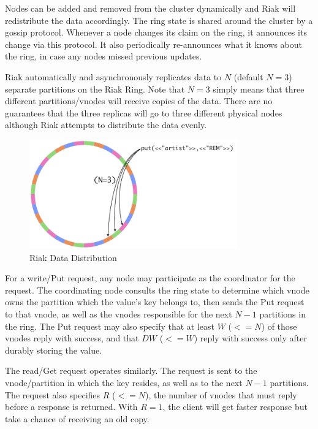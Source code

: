 \documentclass[12pt]{book}
\begin{document}
Nodes can be added and removed from the cluster dynamically and Riak will redistribute the data accordingly. The ring state is shared around the cluster by a gossip protocol. Whenever a node changes its claim on the ring, it announces its change via this protocol. It also periodically re-announces what it knows about the ring, in case any nodes missed previous updates.

Riak automatically and asynchronously replicates data to $N$ (default $N=3$) separate partitions on the Riak Ring. Note that $N=3$ simply means that three different partitions/vnodes will receive copies of the data. There are no guarantees that the three replicas will go to three different physical nodes although Riak attempts to distribute the data evenly.

\begin{figure}[t]
\includegraphics[width=0.8\textwidth]{images/riak-data-distribution.png}
\centering
\caption{Riak Data Distribution}
\end{figure}

For a write/Put request, any node may participate as the coordinator for the request. The coordinating node consults the ring state to determine which vnode owns the partition which the value's key belongs to, then sends the Put request to that vnode, as well as the vnodes responsible for the next $N-1$ partitions in the ring. The Put request may also specify that at least $W$ ($<= N$) of those vnodes reply with success, and that $DW$ ($<= W$) reply with success only after durably storing the value. 

The read/Get request operates similarly. The request is sent to the vnode/partition in which the key resides, as well as to the next $N-1$ partitions. The request also specifies $R$ ($<= N$), the number of vnodes that must reply before a response is returned. With $R=1$, the client will get faster response but take a chance of receiving an old copy.
\end{document}
